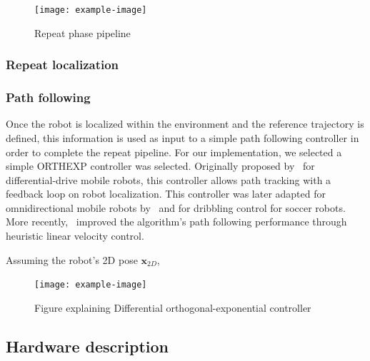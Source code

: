 \lightlipsum[1]

\begin{figure} [htpb]
	\centering
	\texttt{[image: example-image]}
	\caption{Repeat phase pipeline}
	\label{fig:repeat_pipeline}
\end{figure}

\subsubsection{Repeat localization}
\label{sec:rep_loc}

\lightlipsum[1]

\subsubsection{Path following}
\label{sec:orthexp}

Once the robot is localized within the environment and the reference trajectory is defined, this information is used as input to a simple path following controller in order to complete the repeat pipeline.
For our implementation, we selected a simple \ac{ORTHEXP} controller was selected. 
Originally proposed by~\citet{Mojaev2004} for differential-drive mobile robots, this controller allows path tracking with a feedback loop on robot localization.
This controller was later adapted for omnidirectional mobile robots by~\citet{Li2007} and for dribbling control for soccer robots.
More recently,~\citet{Huskic2017} improved the algorithm's path following performance through heuristic linear velocity control.

Assuming the robot's 2D pose $\bm x_{2D}$, 

\citet{Huskic2019} %

\begin{figure} [htpb]
	\centering
	\texttt{[image: example-image]}
	\caption{Figure explaining Differential orthogonal-exponential controller}
	\label{fig:diff_orthexp}
\end{figure}

\subsection{Hardware description}
\label{sec:hardware}

